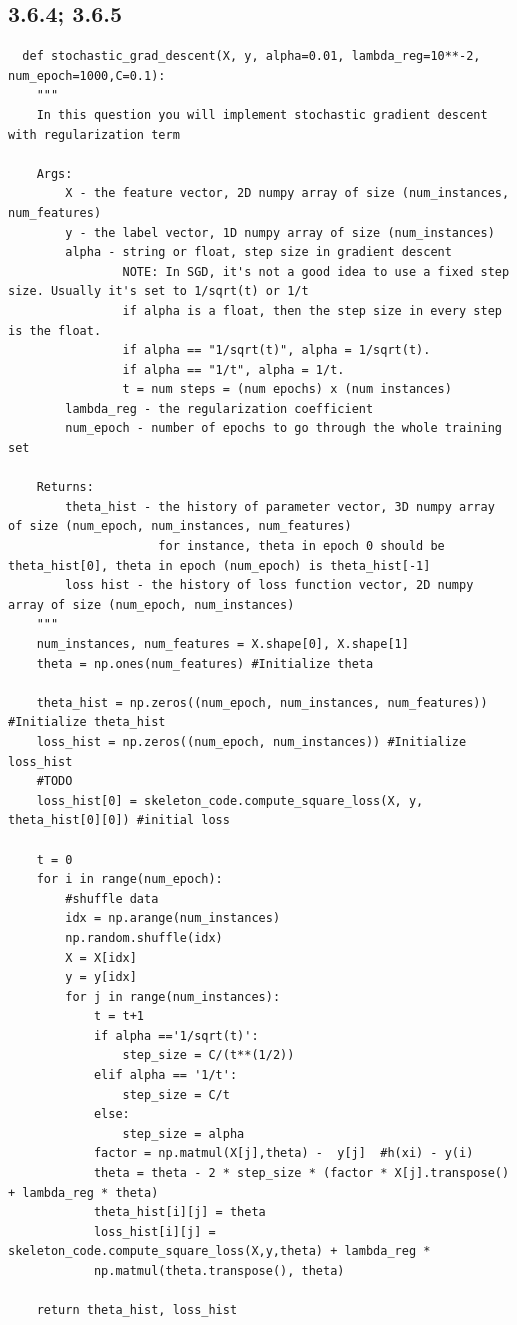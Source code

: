 \documentclass{article}
\begin{document}
\subsection{3.6.4; 3.6.5}
\begin{verbatim}
  def stochastic_grad_descent(X, y, alpha=0.01, lambda_reg=10**-2, num_epoch=1000,C=0.1):
    """
    In this question you will implement stochastic gradient descent with regularization term

    Args:
        X - the feature vector, 2D numpy array of size (num_instances, num_features)
        y - the label vector, 1D numpy array of size (num_instances)
        alpha - string or float, step size in gradient descent
                NOTE: In SGD, it's not a good idea to use a fixed step size. Usually it's set to 1/sqrt(t) or 1/t
                if alpha is a float, then the step size in every step is the float.
                if alpha == "1/sqrt(t)", alpha = 1/sqrt(t).
                if alpha == "1/t", alpha = 1/t.
                t = num steps = (num epochs) x (num instances)
        lambda_reg - the regularization coefficient
        num_epoch - number of epochs to go through the whole training set

    Returns:
        theta_hist - the history of parameter vector, 3D numpy array of size (num_epoch, num_instances, num_features)
                     for instance, theta in epoch 0 should be theta_hist[0], theta in epoch (num_epoch) is theta_hist[-1]
        loss hist - the history of loss function vector, 2D numpy array of size (num_epoch, num_instances)
    """
    num_instances, num_features = X.shape[0], X.shape[1]
    theta = np.ones(num_features) #Initialize theta

    theta_hist = np.zeros((num_epoch, num_instances, num_features)) #Initialize theta_hist
    loss_hist = np.zeros((num_epoch, num_instances)) #Initialize loss_hist
    #TODO
    loss_hist[0] = skeleton_code.compute_square_loss(X, y, theta_hist[0][0]) #initial loss
    
    t = 0
    for i in range(num_epoch):
        #shuffle data
        idx = np.arange(num_instances)
        np.random.shuffle(idx)
        X = X[idx]
        y = y[idx] 
        for j in range(num_instances):
            t = t+1
            if alpha =='1/sqrt(t)':
                step_size = C/(t**(1/2))
            elif alpha == '1/t':
                step_size = C/t
            else:
                step_size = alpha
            factor = np.matmul(X[j],theta) -  y[j]  #h(xi) - y(i)
            theta = theta - 2 * step_size * (factor * X[j].transpose() + lambda_reg * theta)
            theta_hist[i][j] = theta   
            loss_hist[i][j] = skeleton_code.compute_square_loss(X,y,theta) + lambda_reg * 
            np.matmul(theta.transpose(), theta)
            
    return theta_hist, loss_hist 
\end{verbatim}
\end{document}
